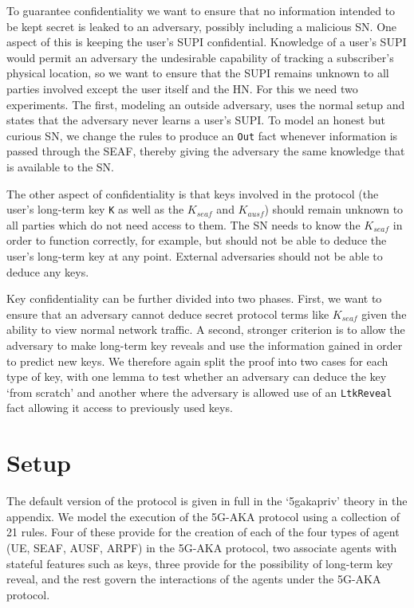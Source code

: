 \documentclass[10pt, pdftex]{article}
\begin{document}
To guarantee confidentiality we want to ensure that no information intended to be kept secret is leaked to an adversary, possibly including a malicious SN. One aspect of this is keeping the user's SUPI confidential. Knowledge of a user's SUPI would permit an adversary the undesirable capability of tracking a subscriber's physical location, so we want to ensure that the SUPI remains unknown to all parties involved except the user itself and the HN. For this we need two experiments. The first, modeling an outside adversary, uses the normal setup and states that the adversary never learns a user's SUPI. To model an honest but curious SN, we change the rules to produce an \verb|Out| fact whenever information is passed through the SEAF, thereby giving the adversary the same knowledge that is available to the SN.

The other aspect of confidentiality is that keys involved in the protocol (the user's long-term key \verb|K| as well as the $K_{seaf}$ and $K_{ausf}$) should remain unknown to all parties which do not need access to them. The SN needs to know the $K_{seaf}$ in order to function correctly, for example, but should not be able to deduce the user's long-term key at any point. External adversaries should not be able to deduce any keys.

Key confidentiality can be further divided into two phases. First, we want to ensure that an adversary cannot deduce secret protocol terms like $K_{seaf}$ given the ability to view normal network traffic. A second, stronger criterion is to allow the adversary to make long-term key reveals and use the information gained in order to predict new keys. We therefore again split the proof into two cases for each type of key, with one lemma to test whether an adversary can deduce the key `from scratch' and another where the adversary is allowed use of an \verb|LtkReveal| fact allowing it access to previously used keys.

\section{Setup}

The default version of the protocol is given in full in the `5gaka\textunderscore priv' theory in the appendix. We model the execution of the 5G-AKA protocol using a collection of 21 rules. Four of these provide for the creation of each of the four types of agent (UE, SEAF, AUSF, ARPF) in the 5G-AKA protocol, two associate agents with stateful features such as keys, three provide for the possibility of long-term key reveal, and the rest govern the interactions of the agents under the 5G-AKA protocol.
\end{document}
